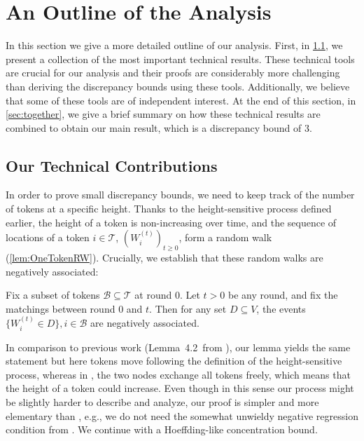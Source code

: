 \documentclass[twoside,leqno]{article}
\DeclareMathOperator{\1}{\mathbf{1}}
\numberwithin{equation}{section}
\begin{document}
\section{An Outline of the Analysis}\label{sec:techniques}

In this section we give a more detailed outline of our analysis. First, in \cref{sec:technical_contributions}, we present a collection of the most important technical results. These technical tools are crucial for our analysis and their proofs are considerably more challenging than deriving the discrepancy bounds using these tools. Additionally, we believe that some of these tools are of independent interest. At the end of this section, in \cref{sec:together}, we give a brief summary on how these technical results are combined to obtain our main result, which is a discrepancy bound of $3$.

\subsection{Our Technical Contributions}\label{sec:technical_contributions}

In order to prove small discrepancy bounds, we need to keep track of the number of tokens at a specific height. Thanks to the height-sensitive process defined earlier, the height of a token is non-increasing over time, and the sequence of locations of a token $i \in \mathcal{T}$, $(W_i^{(t)})_{t \geq 0}$, form a random walk (\cref{lem:OneTokenRW}). Crucially, we establish that these random walks are negatively associated: 
\begin{lemma}
Fix a subset of tokens $\mathcal{B} \subseteq \mathcal{T}$ at round $0$. Let $t > 0$ be any round, and fix the matchings between round $0$ and $t$. Then for any set $D \subseteq V$, the events $\{ W_i^{(t)} \in D \}, i \in \mathcal{B}$ are negatively associated.
\end{lemma}
In comparison to previous work (Lemma~4.2~from \cite{DBLP:conf/focs/SauerwaldS12}), our lemma yields the same statement but here tokens move following the definition of the height-sensitive process, whereas in \cite{DBLP:conf/focs/SauerwaldS12}, the two nodes exchange all tokens freely, which means that the height of a token could increase. Even though in this sense our process might be slightly harder to describe and analyze, our proof is simpler and more elementary than \cite{DBLP:conf/focs/SauerwaldS12}, e.g., we do not need the somewhat unwieldy negative regression condition from \cite{DBLP:journals/rsa/DubhashiR98}. 
We continue with a Hoeffding-like concentration bound.
\end{document}
